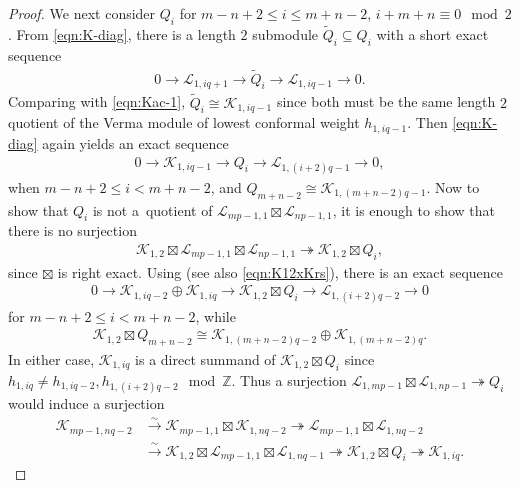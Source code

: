 \documentclass[pdftex]{sigma}
\numberwithin{equation}{section}
\theoremstyle{definition}
\begin{document}
\begin{proof}
We next consider $Q_i$ for $m-n+2\leq i\leq m+n-2$, $i+m+n\equiv 0 \mod 2$. From \eqref{eqn:K-diag}, there is a length $2$ submodule $\widetilde{Q}_i\subseteq Q_i$ with a short exact sequence
\begin{gather*}
0\longrightarrow\mathcal{L}_{1,iq+1}\longrightarrow\widetilde{Q}_i\longrightarrow\mathcal{L}_{1,iq-1}\longrightarrow 0.
\end{gather*}
Comparing with \eqref{eqn:Kac-1}, $\widetilde{Q}_i\cong\mathcal{K}_{1,iq-1}$ since both must be the same length $2$ quotient of the Verma module of lowest conformal weight $h_{1,iq-1}$. Then \eqref{eqn:K-diag} again yields an exact sequence
\begin{gather*}
0\longrightarrow\mathcal{K}_{1,iq-1}\longrightarrow Q_i\longrightarrow\mathcal{L}_{1,(i+2)q-1}\longrightarrow 0,
\end{gather*}
when $m-n+2\leq i< m+n-2$, and $Q_{m+n-2}\cong\mathcal{K}_{1,(m+n-2)q-1}$. Now to show that $Q_i$ is not a~quotient of $\mathcal{L}_{mp-1,1}\boxtimes\mathcal{L}_{np-1,1}$, it is enough to show that there is no surjection
\begin{gather*}
\mathcal{K}_{1,2}\boxtimes\mathcal{L}_{mp-1,1}\boxtimes\mathcal{L}_{np-1,1}\twoheadrightarrow\mathcal{K}_{1,2}\boxtimes Q_i,
\end{gather*}
since $\boxtimes$ is right exact. Using \cite[Theorems 6.5 and 6.8]{MS-cpq-Vir} (see also \eqref{eqn:K12xKrs}), there is an exact sequence
\begin{gather*}
0 \longrightarrow \mathcal{K}_{1, iq-2} \oplus \mathcal{K}_{1, iq} \longrightarrow \mathcal{K}_{1, 2} \boxtimes Q_i \longrightarrow \mathcal{L}_{1, (i+2)q-2} \longrightarrow 0
\end{gather*}
for $m-n+2\leq i<m+n-2$, while
\begin{gather*}
\mathcal{K}_{1,2}\boxtimes Q_{m+n-2}\cong\mathcal{K}_{1,(m+n-2)q-2}\oplus\mathcal{K}_{1,(m+n-2)q}.
\end{gather*}
In either case, $\mathcal{K}_{1,iq}$ is a direct summand of $\mathcal{K}_{1,2}\boxtimes Q_i$ since $h_{1,iq}\neq h_{1,iq-2},h_{1,(i+2)q-2} \mod \mathbb{Z}$. Thus a surjection $\mathcal{L}_{1,mp-1}\boxtimes\mathcal{L}_{1,np-1}\twoheadrightarrow Q_i$ would induce a surjection
\begin{align*}
\mathcal{K}_{mp-1,nq-2}& \xrightarrow{\sim}\mathcal{K}_{mp-1,1}\boxtimes\mathcal{K}_{1,nq-2} \twoheadrightarrow\mathcal{L}_{mp-1,1}\boxtimes\mathcal{L}_{1,nq-2} \nonumber\\
& \xrightarrow{\sim}\mathcal{K}_{1,2}\boxtimes\mathcal{L}_{mp-1,1}\boxtimes\mathcal{L}_{1,nq-1}\twoheadrightarrow\mathcal{K}_{1,2}\boxtimes Q_i\twoheadrightarrow\mathcal{K}_{1,iq}.

\end{align*}
\end{proof}
\end{document}
